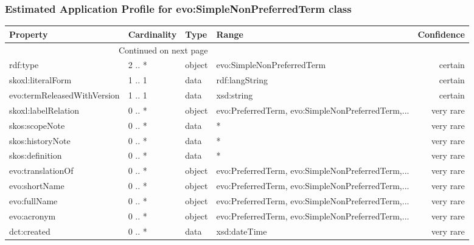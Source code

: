 \documentclass[10pt,a4paper,titlepage,final]{article}
\begin{document}
\subsubsection{Estimated Application Profile for evo:SimpleNonPreferredTerm class}
\begin{tabularx}{\textwidth}{lllXr}
\toprule
                    Property & Cardinality &    Type &                                              Range & Confidence \\
\midrule
\endhead
\midrule
\multicolumn{3}{r}{{Continued on next page}} \\
\midrule
\endfoot

\bottomrule
\endlastfoot
                    rdf:type &      2 .. * &  object &                         evo:SimpleNonPreferredTerm &    certain \\
           skoxl:literalForm &      1 .. 1 &    data &                                     rdf:langString &    certain \\
 evo:termReleasedWithVersion &      1 .. 1 &    data &                                         xsd:string &    certain \\
         skoxl:labelRelation &      0 .. * &  object &  evo:PreferredTerm, evo:SimpleNonPreferredTerm,... &  very rare \\
              skos:scopeNote &      0 .. * &    data &                                                  * &  very rare \\
            skos:historyNote &      0 .. * &    data &                                                  * &  very rare \\
             skos:definition &      0 .. * &    data &                                                  * &  very rare \\
           evo:translationOf &      0 .. * &  object &  evo:PreferredTerm, evo:SimpleNonPreferredTerm,... &  very rare \\
               evo:shortName &      0 .. * &  object &  evo:PreferredTerm, evo:SimpleNonPreferredTerm,... &  very rare \\
                evo:fullName &      0 .. * &  object &  evo:PreferredTerm, evo:SimpleNonPreferredTerm,... &  very rare \\
                 evo:acronym &      0 .. * &  object &  evo:PreferredTerm, evo:SimpleNonPreferredTerm,... &  very rare \\
                 dct:created &      0 .. * &    data &                                       xsd:dateTime &  very rare \\
\end{tabularx}
\end{document}
